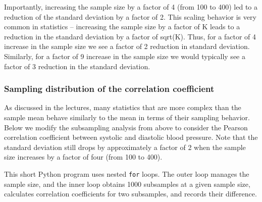 \documentclass[11pt]{article}
\begin{document}
Importantly, increasing the sample size by a factor of 4 (from 100 to
400) led to a reduction of the standard deviation by a factor of 2. This
scaling behavior is very common in statistics -- increasing the sample
size by a factor of K leads to a reduction in the standard deviation by
a factor of sqrt(K). Thus, for a factor of 4 increase in the sample size
we see a factor of 2 reduction in standard deviation. Similarly, for a
factor of 9 increase in the sample size we would typically see a factor
of 3 reduction in the standard deviation.

    \hypertarget{sampling-distribution-of-the-correlation-coefficient}{%
\subsubsection{Sampling distribution of the correlation
coefficient}\label{sampling-distribution-of-the-correlation-coefficient}}

As discussed in the lectures, many statistics that are more complex than
the sample mean behave similarly to the mean in terms of their sampling
behavior. Below we modify the subsampling analysis from above to
consider the Pearson correlation coefficient between systolic and
diastolic blood pressure. Note that the standard deviation still drops
by approximately a factor of 2 when the sample size increases by a
factor of four (from 100 to 400).

This short Python program uses nested \texttt{for} loops. The outer loop
manages the sample size, and the inner loop obtains 1000 subsamples at a
given sample size, calculates correlation coefficients for two
subsamples, and records their difference.
\end{document}

